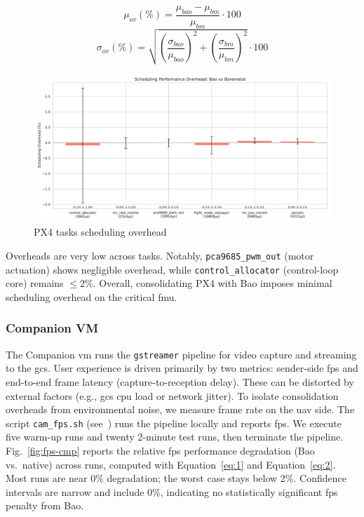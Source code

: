 \begin{equation}
  \label{eq:1}
  \mu_{ov} (\%) = \frac{\mu_{bao} - \mu_{bm}}{\mu_{bm}} \cdot 100
\end{equation}
\begin{equation}
  \label{eq:2}
  \sigma_{ov} (\%) = \sqrt{ \left(\frac{\sigma_{bao}}{\mu_{bao}}\right)^{2} +
    \left(\frac{\sigma_{bm}}{\mu_{bm}}\right)^{2} } \cdot 100
\end{equation}

\begin{figure}[!hbt]
  \centering
  \includegraphics[width=1.0\textwidth]{./img/pdf/px4-sched-overhead} 
  \caption{PX4 tasks scheduling overhead}%
  \label{fig:px4-sched-overhead}
\end{figure}

Overheads are very low across tasks. Notably, \lstinline{pca9685_pwm_out} (motor
actuation) shows negligible overhead, while \lstinline{control_allocator}
(control-loop core) remains $\leq 2\%$. Overall, consolidating PX4 with Bao
imposes minimal scheduling overhead on the critical \gls{fmu}.

\subsubsection{Companion VM}
\label{sec:companion-vm}
The Companion \gls{vm} runs the \lstinline{gstreamer} pipeline for video capture
and streaming to the \gls{gcs}. User experience is driven primarily by two
metrics: sender-side \gls{fps} and end-to-end frame latency
(capture-to-reception delay). These can be distorted by external factors (e.g.,
\gls{gcs} \gls{cpu} load or network jitter).
%
To isolate consolidation overheads from environmental noise, we measure frame
rate on the \gls{uav} side. The script \lstinline{cam_fps.sh}
(see~\cite{thesis-sw-github}) runs the pipeline locally and reports
\gls{fps}. We execute five warm-up runs and twenty 2-minute test runs, then
terminate the pipeline.
%
Fig.~\ref{fig:fps-cmp} reports the relative \gls{fps} performance degradation
(Bao vs.\ native) across runs, computed with Equation~\ref{eq:1} and
Equation~\ref{eq:2}. Most runs are near 0\% degradation; the worst case stays
below 2\%. Confidence intervals are narrow and include 0\%, indicating no
statistically significant \gls{fps} penalty from Bao.

